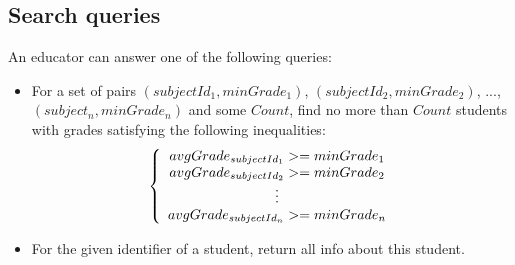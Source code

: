 \subsection{Search queries}
\label{sec:search-queries}

An educator can answer one of the following queries:
\begin{itemize}
\item For a set of pairs $(subjectId_1, minGrade_1)$, $(subjectId_2, minGrade_2)$, ..., $(subject_n, minGrade_n)$ and some $Count$, find no more than $Count$  students with grades satisfying the following inequalities:
\[
\left\{
\begin{array}{c}
avgGrade_{subjectId_1} >= minGrade_1 \\ avgGrade_{subjectId_2} >= minGrade_2 \\
\mathrel{\makebox[\widthof{=}]{\vdots}} \\ avgGrade_{subjectId_n} >= minGrade_n
\end{array}
\right.
\]

\item For the given identifier of a student, return all info about this student.
\end{itemize}
